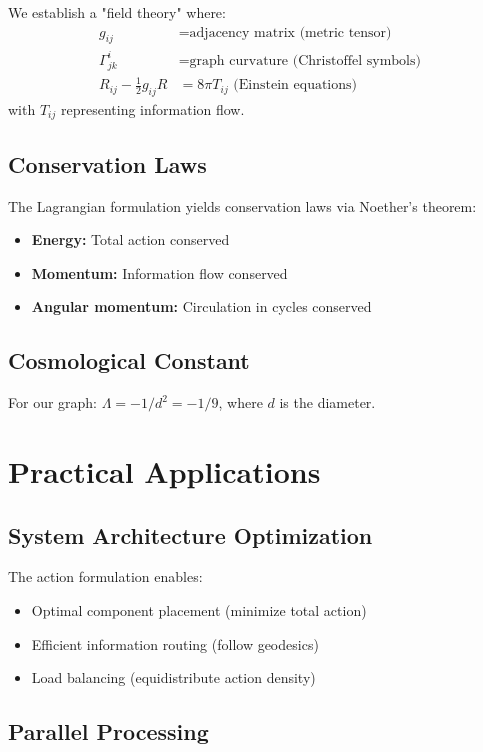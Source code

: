 \documentclass[12pt,a4paper]{article}
\begin{document}
We establish a "field theory" where:
\begin{align}
g_{ij} &= \text{adjacency matrix (metric tensor)} \\
\Gamma^i_{jk} &= \text{graph curvature (Christoffel symbols)} \\
R_{ij} - \frac{1}{2}g_{ij}R &= 8\pi T_{ij} \text{ (Einstein equations)}
\end{align}
with $T_{ij}$ representing information flow.

\subsection{Conservation Laws}

The Lagrangian formulation yields conservation laws via Noether's theorem:
\begin{itemize}
    \item \textbf{Energy:} Total action conserved
    \item \textbf{Momentum:} Information flow conserved
    \item \textbf{Angular momentum:} Circulation in cycles conserved
\end{itemize}

\subsection{Cosmological Constant}

For our graph: $\Lambda = -1/d^2 = -1/9$, where $d$ is the diameter.

\section{Practical Applications}

\subsection{System Architecture Optimization}

The action formulation enables:
\begin{itemize}
    \item Optimal component placement (minimize total action)
    \item Efficient information routing (follow geodesics)
    \item Load balancing (equidistribute action density)
\end{itemize}

\subsection{Parallel Processing}
\end{document}
